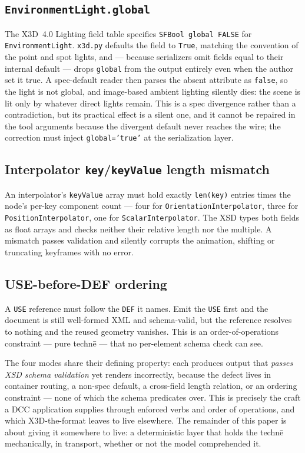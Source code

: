 \documentclass[sigconf,nonacm,screen,anonymous]{acmart}
\begin{document}
\subsection{\texttt{EnvironmentLight.global}}
The X3D~4.0 Lighting field table specifies \texttt{SFBool global FALSE} for \texttt{EnvironmentLight}. \texttt{x3d.py} defaults the field to \texttt{True}, matching the convention of the point and spot lights, and --- because serializers omit fields equal to their internal default --- drops \texttt{global} from the output entirely even when the author set it true. A spec-default reader then parses the absent attribute as \texttt{false}, so the light is not global, and image-based ambient lighting silently dies: the scene is lit only by whatever direct lights remain. This is a spec divergence rather than a contradiction, but its practical effect is a silent one, and it cannot be repaired in the tool arguments because the divergent default never reaches the wire; the correction must inject \texttt{global='true'} at the serialization layer.

\subsection{Interpolator \texttt{key}/\texttt{keyValue} length mismatch}
An interpolator's \texttt{keyValue} array must hold exactly \texttt{len(key)} entries times the node's per-key component count --- four for \texttt{OrientationInterpolator}, three for \texttt{PositionInterpolator}, one for \texttt{ScalarInterpolator}. The XSD types both fields as float arrays and checks neither their relative length nor the multiple. A mismatch passes validation and silently corrupts the animation, shifting or truncating keyframes with no error.

\subsection{USE-before-DEF ordering}
A \texttt{USE} reference must follow the \texttt{DEF} it names. Emit the \texttt{USE} first and the document is still well-formed XML and schema-valid, but the reference resolves to nothing and the reused geometry vanishes. This is an order-of-operations constraint --- pure technē --- that no per-element schema check can see.

The four modes share their defining property: each produces output that \emph{passes XSD schema validation} yet renders incorrectly, because the defect lives in container routing, a non-spec default, a cross-field length relation, or an ordering constraint --- none of which the schema predicates over. This is precisely the craft a DCC application supplies through enforced verbs and order of operations, and which X3D-the-format leaves to live elsewhere. The remainder of this paper is about giving it somewhere to live: a deterministic layer that holds the technē mechanically, in transport, whether or not the model comprehended it.
\end{document}
